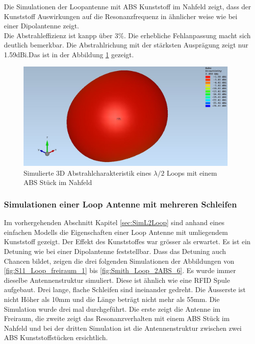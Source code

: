 Die Simulationen der Loopantenne mit ABS Kunststoff im Nahfeld  zeigt, dass der Kunststoff  Auswirkungen auf die Resonanzfrequenz in ähnlicher weise wie bei einer Dipolantenne zeigt.\\
Die Abstrahleffizienz ist kanpp über $3\%$. Die erhebliche Fehlanpassung macht sich deutlich bemerkbar. Die Abstrahlrichung mit der stärksten Ausprägung zeigt nur 1.59dBi.Das ist in der Abbildung \ref{fig:sim_Loop_freiraum_3D_2ABS} gezeigt.
\begin{figure}[h]
	\centering
	\includegraphics[width=11cm]{content/bilder/Evaluation/Loop/L2/2ABS/EM_Far_Field_Loop_Lambda2_mit2ABS.JPG}%
	\caption{Simulierte 3D Abstrahlcharakteristik eines $\lambda/2$ Loops mit einem ABS Stück im Nahfeld}
	\label{fig:sim_Loop_freiraum_3D_2ABS}
\end{figure}

\newpage
\subsubsection{Simulationen einer Loop Antenne mit mehreren Schleifen}
Im vorhergehenden Abschnitt Kapitel \ref{sec:SimL2Loop} sind anhand eines einfachen Modells die Eigenschaften einer Loop Antenne mit umliegendem Kunststoff gezeigt. Der Effekt des Kunststoffes war grösser als erwartet. Es ist ein Detuning wie bei einer Dipolantenne feststellbar. Dass das Detuning auch Chancen bildet, zeigen die drei folgenden Simulationen der Abbildungen von \ref{fig:S11_Loop_freiraum_1} bis \ref{fig:Smith_Loop_2ABS_6}. Es wurde immer dieselbe Antennenstruktur simuliert. Diese ist ähnlich wie eine RFID Spule aufgebaut. Drei lange, flache Schleifen sind ineinander gedreht. Die Äusserste ist nicht Höher als 10mm und die Länge beträgt nicht mehr als 55mm. Die Simulation wurde drei mal durchgeführt. Die erste zeigt die Antenne im Freiraum, die zweite zeigt das Resonanzverhalten mit einem ABS Stück im Nahfeld und bei der dritten Simulation ist die Antennenstruktur zwischen zwei ABS Kunststoffstücken ersichtlich.\\

